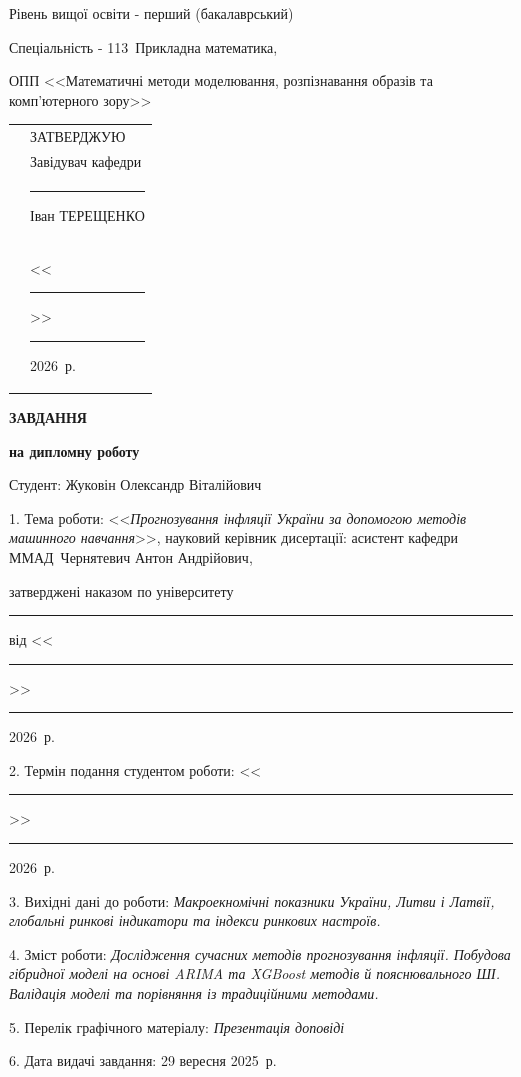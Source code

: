 \documentclass[a4paper,ukrainian,oneside]{extreport}
\newcommand{\setfontsize}[1]{\fontsize{#1pt}{#1pt}\selectfont}
\newcommand{\reportAuthor}{Жуковін Олександр Віталійович}
\newcommand{\reportTitle}{Прогнозування інфляції України за допомогою методів машинного навчання}
\newcommand{\supervisorFio}{Чернятевич Антон Андрійович}
\newcommand{\supervisorRegalia}{асистент кафедри ММАД}
\newcommand{\YearOfDefence}{2026}
\newcommand{\YearOfBeginning}{2025}
\begin{document}
Рівень вищої освіти - перший (бакалаврський)

Спеціальність - 113~Прикладна математика,

ОПП <<Математичні методи моделювання, розпізнавання образів та комп'ютерного зору>>

\vspace{10mm}
\begin{tabularx}{\textwidth}{XX}
& ЗАТВЕРДЖУЮ                                      \\[06pt]
& Завідувач кафедри                               \\[06pt]
& \rule{2.5cm}{0.25pt} Іван ТЕРЕЩЕНКО             \\[06pt]
& <<\rule{0.5cm}{0.25pt}>> \rule{2.5cm}{0.25pt} \YearOfDefence~р.
\end{tabularx}

\vspace{5mm}
\begin{center}
{\bfseries ЗАВДАННЯ \par}
{\bfseries на дипломну роботу \par}
\end{center}

\frenchspacing
\doublespacing          %
\setfontsize{14}

Студент: \reportAuthor \par

1. Тема роботи: <<\emph{\reportTitle}>>,
науковий керівник дисертації: \supervisorRegalia~\supervisorFio, \par
затверджені наказом по університету \No~\rule{0.5cm}{0.25pt} від <<\rule{0.5cm}{0.25pt}>> \rule{2.5cm}{0.25pt} \YearOfDefence~р.

2. Термін подання студентом роботи: <<\rule{0.5cm}{0.25pt}>> \rule{2.5cm}{0.25pt} \YearOfDefence~р.

3. Вихідні дані до роботи: \emph{Макроекномічні показники України, Литви і Латвії, глобальні ринкові індикатори та індекси ринкових настроїв.}

4. Зміст роботи: \emph{Дослідження сучасних методів прогнозування інфляції. Побудова гібридної моделі на основі ARIMA та XGBoost методів й пояснювального ШІ. Валідація моделі та порівняння із традиційними методами.}

5. Перелік графічного матеріалу: \emph{Презентація доповіді}

6. Дата видачі завдання: 29 вересня \YearOfBeginning~р.

\newpage
\end{document}
